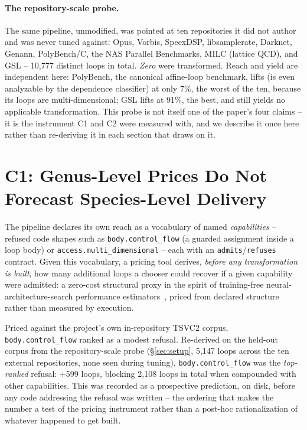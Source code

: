 \documentclass[sigconf,review,anonymous]{acmart}
\begin{document}
\paragraph{The repository-scale probe.} The same pipeline, unmodified, was
pointed at ten repositories it did not author and was never tuned against:
Opus, Vorbis, SpeexDSP, libsamplerate, Darknet, Genann, PolyBench/C, the NAS
Parallel Benchmarks, MILC (lattice QCD), and GSL -- 10{,}777 distinct loops
in total. \emph{Zero} were transformed. Reach and yield are independent
here: PolyBench, the canonical affine-loop benchmark, lifts (is even
analyzable by the dependence classifier) at only 7\%, the worst of the ten,
because its loops are multi-dimensional; GSL lifts at 91\%, the best, and
still yields no applicable transformation. This probe is not itself one of
the paper's four claims -- it is the instrument C1 and C2 were measured
with, and we describe it once here rather than re-deriving it in each
section that draws on it.

\section{C1: Genus-Level Prices Do Not Forecast Species-Level Delivery}
\label{sec:c1}

The pipeline declares its own reach as a vocabulary of named
\emph{capabilities} -- refused code shapes such as \texttt{body.control\_flow}
(a guarded assignment inside a loop body) or \texttt{access.multi\_dimensional}
-- each with an \texttt{admits}/\texttt{refuses} contract. Given this
vocabulary, a pricing tool derives, \emph{before any transformation is
built}, how many additional loops a chooser could recover if a given
capability were admitted: a zero-cost structural proxy in the spirit of
training-free neural-architecture-search performance
estimators~\cite{nas-survey}, priced from declared structure rather than
measured by execution.

Priced against the project's own in-repository TSVC2 corpus,
\texttt{body.control\_flow} ranked as a modest refusal. Re-derived on the
held-out corpus from the repository-scale probe (\S\ref{sec:setup}, 5{,}147
loops across the ten external repositories, none seen during tuning),
\texttt{body.control\_flow} was the \emph{top-ranked} refusal: +599 loops,
blocking 2{,}108 loops in total when compounded with other capabilities.
This was recorded as a prospective prediction, on disk, before any code
addressing the refusal was written -- the ordering that makes the number a
test of the pricing instrument rather than a post-hoc rationalization of
whatever happened to get built.
\end{document}
